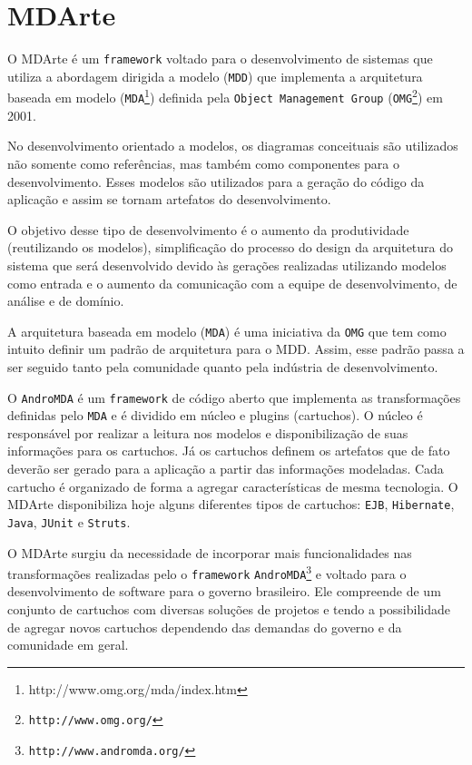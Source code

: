 \chapter{MDArte}
O MDArte é um \texttt{framework} voltado para o desenvolvimento de sistemas que
utiliza a abordagem dirigida a modelo (\texttt{MDD}) que implementa a
arquitetura baseada em modelo
(\texttt{MDA}\footnote{http://www.omg.org/mda/index.htm}) definida pela
\texttt{Object Management Group} (\texttt{OMG\footnote{http://www.omg.org/}}) em 2001.

No desenvolvimento orientado a modelos, os diagramas conceituais são utilizados
não somente como referências, mas também como componentes para o
desenvolvimento. Esses modelos são utilizados para a geração do código da
aplicação e assim se tornam artefatos do desenvolvimento.

O objetivo desse tipo de desenvolvimento é o aumento da produtividade
(reutilizando os modelos), simplificação do processo do design da arquitetura do
sistema que será desenvolvido devido às gerações realizadas utilizando modelos
como entrada e o aumento da comunicação com a equipe de desenvolvimento, de
análise e de domínio.

A arquitetura baseada em modelo (\texttt{MDA}) é uma iniciativa da \texttt{OMG}
que tem como intuito definir um padrão de arquitetura para o MDD. Assim, esse padrão passa a
ser seguido tanto pela comunidade quanto pela indústria de desenvolvimento.

O \texttt{AndroMDA} é um \texttt{framework} de código aberto que implementa as
transformações definidas pelo \texttt{MDA} e é dividido em núcleo e plugins
(cartuchos). O núcleo é responsável por realizar a leitura nos modelos e disponibilização de suas
informações para os cartuchos. Já os cartuchos definem os artefatos que de fato
deverão ser gerado para a aplicação a partir das informações modeladas. Cada
cartucho é organizado de forma a agregar características de mesma tecnologia.
O MDArte disponibiliza hoje alguns diferentes tipos de cartuchos: \texttt{EJB},
\texttt{Hibernate}, \texttt{Java}, \texttt{JUnit} e \texttt{Struts}.

O MDArte surgiu da necessidade de incorporar mais funcionalidades nas
transformações realizadas pelo o \texttt{framework}
\texttt{AndroMDA\footnote{http://www.andromda.org/}} e voltado para o
desenvolvimento de software para o governo brasileiro. Ele compreende de um conjunto de cartuchos
com diversas soluções de projetos e tendo a possibilidade de agregar novos
cartuchos dependendo das demandas do governo e da comunidade em geral.